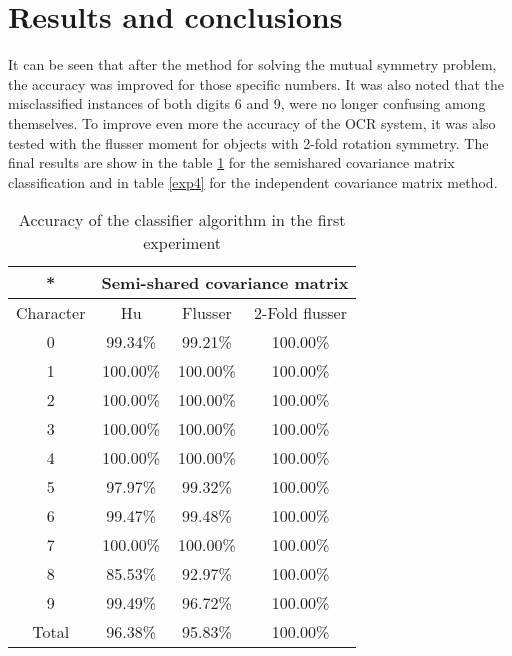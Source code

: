 \documentclass[10pt,journal]{IEEEtran}
\begin{document}
	\section{Results and conclusions}
	It can be seen that after the method for solving the mutual symmetry problem, the accuracy
	was improved for those specific numbers. It was also noted that the misclassified instances
	of both digits 6 and 9, were no longer confusing among themselves. To improve even more the
	accuracy of the OCR system, it was also tested with the flusser moment for objects with 2-fold
	rotation symmetry. The final results are show in the table \ref{exp3} for the semishared 
	covariance matrix classification and in table \ref{exp4} for the independent covariance matrix
	method. 
	
	\begin{table}
	\begin{center}
	\begin{tabular}{|c|c|c|c|}
		\hline
		* & \multicolumn{3}{|c|}{Semi-shared covariance matrix} \\
		\hline
		Character & Hu & Flusser & 2-Fold flusser\\
		\hline
		0 & 99.34\% & 99.21\% & 100.00\% \\
		1 &	100.00\% & 100.00\% & 100.00\% \\
		2 &	100.00\% & 100.00\% & 100.00\% \\
		3 &	100.00\% & 100.00\% & 100.00\% \\
		4 &	100.00\% & 100.00\%	& 100.00\% \\		
		5 & 97.97\% & 99.32\% & 100.00\% \\ 
		6 & 99.47\% & 99.48\% & 100.00\% \\
		7 & 100.00\% & 100.00\% & 100.00\% \\
		8 & 85.53\% & 92.97\% & 100.00\% \\
		9 &	99.49\% & 96.72\% & 100.00\% \\
		\hline
		Total & 96.38\% & 95.83\% & 100.00\% \\
		\hline
	\end{tabular}
	\end{center}
	\caption{Accuracy of the classifier algorithm in the first experiment}	
	\label{exp3}
	\end{table}
	
\end{document}
